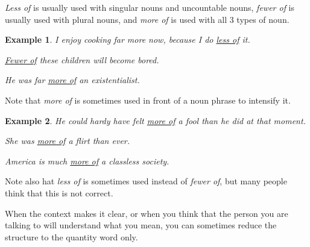 \documentclass[oneside]{book}
\numberwithin{equation}{section}
\newtheorem{example}{Example}[section]
\begin{document}
\textit{Less of} is usually used with singular nouns and uncountable nouns, \textit{fewer of} is usually used with plural nouns, and \textit{more of} is used with all 3 types of noun.
\begin{example}
    I enjoy cooking far more now, because I do \underline{less of} it.
    
    \underline{Fewer of} these children will become bored.
    
    He was far \underline{more of} an existentialist.
\end{example}
Note that \textit{more of} is sometimes used in front of a noun phrase to intensify it.
\begin{example}
    He could hardy have felt \underline{more of} a fool than he did at that moment.
    
    She was \underline{more of} a flirt than ever.
    
    America is much \underline{more of} a classless society.
\end{example}
Note also hat \textit{less of} is sometimes used instead of \textit{fewer of}, but many people think that this is not correct.

%
\noindent{} When the context makes it clear, or when you think that the person you are talking to will understand what you mean, you can sometimes reduce the structure to the quantity word only.
\end{document}
